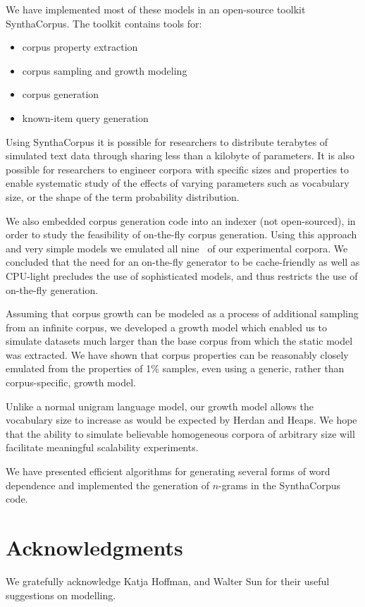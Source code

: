 \documentclass[11pt]{report}
\newcommand{\numcolls}{nine}
\begin{document}
We have implemented most of these models in an open-source toolkit
SynthaCorpus.  The toolkit contains tools for:

\begin{itemize}
\item corpus property extraction
\item corpus sampling and growth modeling
\item corpus generation
\item known-item query generation
\end{itemize}

Using SynthaCorpus it is possible for researchers to distribute terabytes of
simulated text data through sharing less than a kilobyte of parameters.
It is also possible for researchers to engineer corpora with 
specific sizes and properties to enable systematic study of the effects
of varying parameters such as vocabulary size, or the shape of the
term probability distribution.

We also embedded corpus generation code into an indexer (not open-sourced), in order to
study the feasibility of on-the-fly corpus generation. Using this
approach and very simple models we emulated all \numcolls~ of our
experimental corpora.  We concluded that the need for an on-the-fly
generator to be cache-friendly as well as CPU-light precludes the use
of sophisticated models, and thus restricts the use of on-the-fly generation.

Assuming that corpus growth can be modeled as a process of additional
sampling from an infinite corpus, we developed a growth model
which enabled us to simulate datasets much 
larger than the base corpus from which the static model was extracted.
We have shown that corpus properties can be reasonably closely 
emulated from the properties of 1\% samples, even using a generic,
rather than corpus-specific, growth model.  

Unlike a normal unigram language model, our growth model allows the
vocabulary size to increase as would be expected by Herdan and Heaps.
We hope that the ability to simulate believable homogeneous corpora of
arbitrary size will facilitate meaningful scalability experiments.

We have presented efficient algorithms for generating several forms of
word dependence and implemented the generation of $n$-grams in the
SynthaCorpus code.  

\chapter*{Acknowledgments}
We gratefully acknowledge 
Katja Hoffman, and Walter Sun
for their useful suggestions on modelling.




\end{document}
